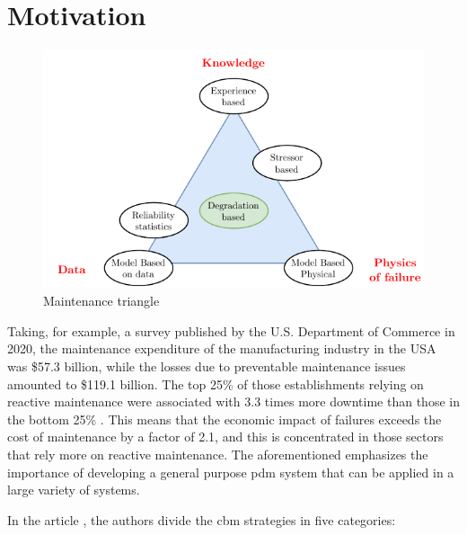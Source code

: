 \section{Motivation}
\label{sec:motivation}

\begin{figure}
    \centering
    \includegraphics[scale=1.3]{images/Intro/MaintTriangle.pdf}
    \caption{Maintenance triangle}
    \label{fig:MaintTriangle}
\end{figure} 

Taking, for example, a survey published by the U.S. Department of Commerce in 2020, the maintenance expenditure of the manufacturing industry in the USA was \$57.3 billion, while the losses due to preventable maintenance issues amounted to \$119.1 billion. The top 25\% of those establishments relying on reactive maintenance were associated with 3.3 times more downtime than those in the bottom 25\% \cite{NIST}. This means that the economic impact of failures exceeds the cost of maintenance by a factor of 2.1, and this is concentrated in those sectors that rely more on reactive maintenance. The aforementioned emphasizes the importance of developing a general purpose \gls{pdm} system that can be applied in a large variety of systems.

In the article \cite{Maintenance_cat}, the authors divide the \gls{cbm} strategies in five categories:

